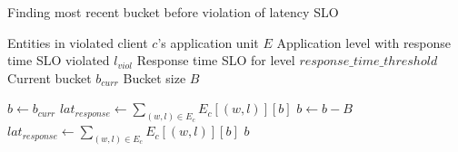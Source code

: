 \begin{algorithm}
\caption{Finding most recent bucket before violation of latency SLO}
\begin{algorithmic}[1]
\Require Entities in violated client $c$'s application unit $E$
\Require Application level with response time SLO violated $l_{viol}$
\Require Response time SLO for level $response\_time\_threshold$
\Require Current bucket $b_{curr}$
\Require Bucket size $B$

\State $b \gets b_{curr}$
\State $lat_{response} \gets \sum_{\left( w, l\right) \in E_c}{E_c[\left( w, l\right)][b]}$
    \State $b \gets b - B$ 
    \State $lat_{response} \gets \sum_{\left( w, l\right) \in E_c}{E_c[\left( w, l\right)][b]}$
\EndWhile
\State \Return $b$
\end{algorithmic}
\end{algorithm}

